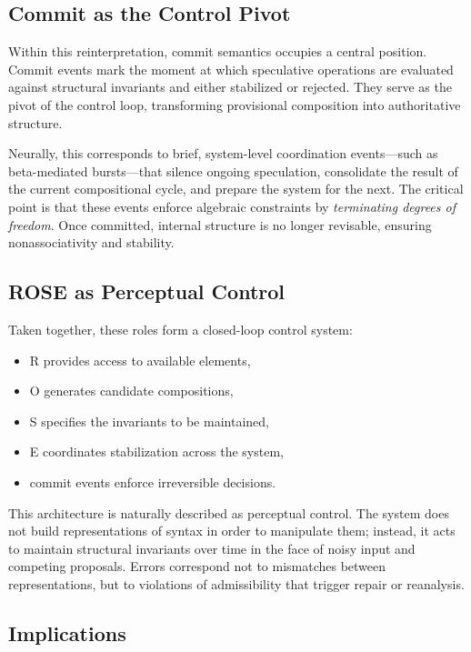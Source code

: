 \documentclass[11pt]{article}
\begin{document}
\subsection{Commit as the Control Pivot}

Within this reinterpretation, commit semantics occupies a central position. Commit events mark the moment at which speculative operations are evaluated against structural invariants and either stabilized or rejected. They serve as the pivot of the control loop, transforming provisional composition into authoritative structure.

Neurally, this corresponds to brief, system-level coordination events—such as beta-mediated bursts—that silence ongoing speculation, consolidate the result of the current compositional cycle, and prepare the system for the next. The critical point is that these events enforce algebraic constraints by \emph{terminating degrees of freedom}. Once committed, internal structure is no longer revisable, ensuring nonassociativity and stability.

\subsection{ROSE as Perceptual Control}

Taken together, these roles form a closed-loop control system:
\begin{itemize}
  \item R provides access to available elements,
  \item O generates candidate compositions,
  \item S specifies the invariants to be maintained,
  \item E coordinates stabilization across the system,
  \item commit events enforce irreversible decisions.
\end{itemize}

This architecture is naturally described as perceptual control. The system does not build representations of syntax in order to manipulate them; instead, it acts to maintain structural invariants over time in the face of noisy input and competing proposals. Errors correspond not to mismatches between representations, but to violations of admissibility that trigger repair or reanalysis.

\subsection{Implications}
\end{document}
